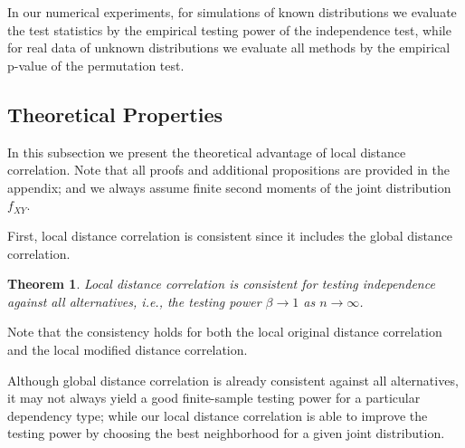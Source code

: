 \documentclass[12pt]{article}
\newtheorem{thm}{Theorem}
\begin{document}
In our numerical experiments, for simulations of known distributions we evaluate the test statistics by the empirical testing power of the independence test, while for real data of unknown distributions we evaluate all methods by the empirical p-value of the permutation test. 



\subsection{Theoretical Properties}
\label{main4}
In this subsection we present the theoretical advantage of local distance correlation. Note that all proofs and additional propositions are provided in the appendix; and we always assume finite second moments of the joint distribution $f_{XY}$.

First, local distance correlation is consistent since it includes the global distance correlation.
\begin{thm}
\label{thm1}
Local distance correlation is consistent for testing independence against all alternatives, i.e., the testing power $\beta \rightarrow 1$ as $n \rightarrow \infty$. 
\end{thm}
Note that the consistency holds for both the local original distance correlation and the local modified distance correlation.

Although global distance correlation is already consistent against all alternatives, it may not always yield a good finite-sample testing power for a particular dependency type; while our local distance correlation is able to improve the testing power by choosing the best neighborhood for a given joint distribution. 
\end{document}
